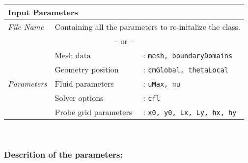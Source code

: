 	\begin{tabular}{l|lp{7cm}}
		\multicolumn{2}{l}{\textbf{Input Parameters}} & \\ \hline
		\textit{File Name} & \multicolumn{2}{l}{Containing all the parameters to re-initalize the class.} \\ \hline
		\multicolumn{3}{c}{-- or --} \\ \hline
		\multirow{5}{*}{\textit{Parameters}} & Mesh data &: \texttt{mesh, boundaryDomains}\\ \cline{2-3}
		& Geometry position &: \texttt{cmGlobal, thetaLocal} \\ \cline{2-3}
		& Fluid parameters &: \texttt{uMax, nu}\\ \cline{2-3}
		& Solver options &: \texttt{cfl}\\ \cline{2-3}
		& Probe grid parameters &: \texttt{x0, y0, Lx, Ly, hx, hy}\\ \cline{2-3}

	\end{tabular}\\
	\subsubsection*{Descrition of the parameters:}
	
